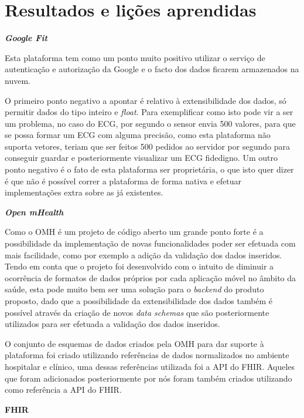 \section{Resultados e lições aprendidas}

\textbf{\textit{Google Fit}}
\par
Esta plataforma tem como um ponto muito positivo utilizar o serviço de autenticação e autorização da Google e o facto dos dados ficarem armazenados na nuvem.\par 
O primeiro ponto negativo a apontar é relativo à extensibilidade dos dados, só permitir dados do tipo inteiro e \textit{float}. Para exemplificar como isto pode vir a ser um problema, no caso do \gls{ECG}, por segundo o sensor envia 500 valores, para que se possa formar um \gls{ECG} com alguma precisão, como esta plataforma não suporta vetores, teriam que ser feitos 500 pedidos ao servidor por segundo para conseguir guardar e posteriormente visualizar um \gls{ECG} fidedigno. Um outro ponto negativo é o fato de esta plataforma ser proprietária, o que isto quer dizer é que não é possível correr a plataforma de forma nativa e efetuar implementações extra sobre as já existentes.
\par
\textbf{\textit{Open mHealth}}
\par
Como o \gls{OMH} é um projeto de código aberto um grande ponto forte é a possibilidade da implementação de novas funcionalidades poder ser efetuada com mais facilidade, como por exemplo a adição da validação dos dados inseridos. Tendo em conta que o projeto foi desenvolvido com o intuito de diminuir a ocorrência de formatos de dados próprios por cada aplicação móvel no âmbito da saúde, esta pode muito bem ser uma solução para o \textit{backend} do produto proposto, dado que a possibilidade da extensibilidade dos dados também é possível através da criação de novos \textit{data schemas} que são posteriormente utilizados para ser efetuada a validação dos dados inseridos.
\par
O conjunto de esquemas de dados criados pela \gls{OMH} para dar suporte à plataforma foi criado utilizando referências de dados normalizados no ambiente hospitalar e clínico, uma dessas referências utilizada foi a \gls{API} do \gls{FHIR}. Aqueles que foram adicionados posteriormente por nós foram também criados utilizando como referência a \gls{API} do \gls{FHIR}.
\par
\textbf{FHIR}
\par
